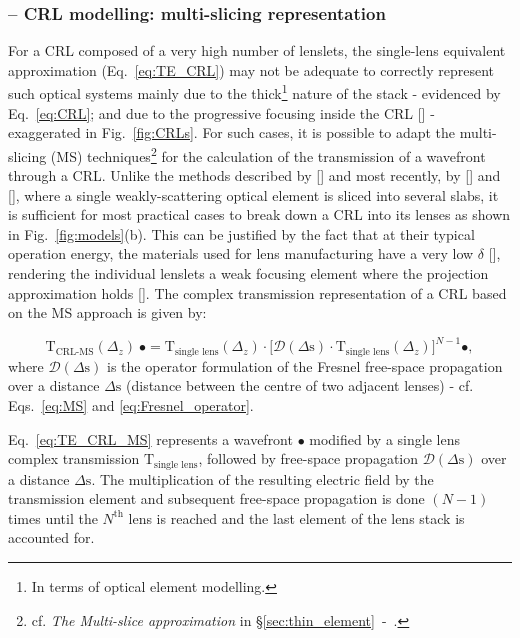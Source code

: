 \begin{refsection}
\subsubsection*{-- CRL modelling: multi-slicing representation}

For a CRL composed of a very high number of lenslets, the single-lens equivalent approximation (Eq.~\ref{eq:TE_CRL}) may not be adequate to correctly represent such optical systems mainly due to the thick\footnote{In terms of optical element modelling.} nature of the stack  - evidenced by Eq.~\ref{eq:CRL}; and due to the progressive focusing inside the CRL [\cite{Schroer2005}] - exaggerated in Fig.~\ref{fig:CRLs}. For such cases, it is possible to adapt the multi-slicing (MS) techniques\footnote{cf. \textit{The Multi-slice approximation} in \S\ref{sec:thin_element}~-~\textit{}.} for the calculation of the transmission of a wavefront through a CRL. Unlike the methods described by [\cite{Paganin2006}] and most recently, by [\cite{Li2017}] and [\cite{Munro2019}], where a single weakly-scattering optical element is sliced into several slabs, it is sufficient for most practical cases to break down a CRL into its lenses as shown in  Fig.~\ref{fig:models}(b). This can be justified by the fact that at their typical operation energy, the materials used for lens manufacturing have a very low $\delta$ [\cite{Serebrennikov2016}], rendering the individual lenslets a weak focusing element where the projection approximation holds [\cite{Protopopov1998}]. The complex transmission representation of a CRL based on the MS approach is given by:

\begin{equation}\label{eq:TE_CRL_MS}
    \mathrm{T}_{\text{CRL-MS}}(\Delta_z)~\bullet = \mathrm{T}_{\text{single lens}}(\Delta_z)\cdot\big[\mathcal{D}({\Delta}\text{s})\cdot\mathrm{T}_{\text{single lens}}(\Delta_z)\big]^{N-1}\bullet,
\end{equation}{}
where $\mathcal{D}({\Delta}\text{s})$ is the operator formulation of the Fresnel free-space propagation over a distance $\Delta\text{s}$ (distance between the centre of two adjacent lenses) - cf. Eqs.~\ref{eq:MS} and \ref{eq:Fresnel_operator}. 

Eq.~\ref{eq:TE_CRL_MS} represents a wavefront $\bullet$ modified by a single lens complex transmission $\mathrm{T}_{\text{single lens}}$, followed by free-space propagation $\mathcal{D}({\Delta}\text{s})$ over a distance $\Delta \text{s}$. The multiplication of the resulting electric field by the transmission element and subsequent free-space propagation is done $(N-1)$ times until the $N^{\text{th}}$ lens is reached and the last element of the lens stack is accounted for.


\end{refsection}
